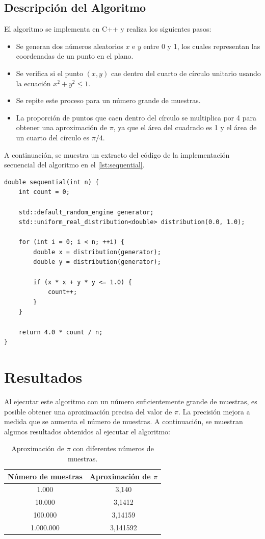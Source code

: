 \documentclass[a4paper, 10pt, onecolumn]{IEEEtran}
\begin{document}
\subsection{Descripción del Algoritmo}
El algoritmo se implementa en C++ y realiza los siguientes pasos:

\begin{itemize}
    \item Se generan dos números aleatorios $x$ e $y$ entre 0 y 1, los cuales representan las coordenadas de un punto en el plano.
    \item Se verifica si el punto $(x, y)$ cae dentro del cuarto de círculo unitario usando la ecuación $x^2 + y^2 \leq 1$.
    \item Se repite este proceso para un número grande de muestras.
    \item La proporción de puntos que caen dentro del círculo se multiplica por 4 para obtener una aproximación de $\pi$, ya que el área del cuadrado es 1 y el área de un cuarto del círculo es $\pi/4$.
\end{itemize}

A continuación, se muestra un extracto del código de la implementación secuencial del algoritmo en el \cref{lst:sequential}.

\begin{lstlisting}[caption={Implementación Secuencial de Monte Carlo en C++}, label={lst:sequential}]
double sequential(int n) {
	int count = 0;
	
	std::default_random_engine generator;
	std::uniform_real_distribution<double> distribution(0.0, 1.0);
	
	for (int i = 0; i < n; ++i) {
		double x = distribution(generator);
		double y = distribution(generator);
		
		if (x * x + y * y <= 1.0) {
			count++;
		}
	}
	
	return 4.0 * count / n;
}
\end{lstlisting}

\section{Resultados}
Al ejecutar este algoritmo con un número suficientemente grande de muestras, es posible obtener una aproximación precisa del valor de $\pi$. La precisión mejora a medida que se aumenta el número de muestras. A continuación, se muestran algunos resultados obtenidos al ejecutar el algoritmo:

\begin{table}[H]
    \centering
    \begin{tabular}{|c|c|}
    \hline
    \textbf{Número de muestras} & \textbf{Aproximación de $\pi$} \\
    \hline
    1.000 & 3,140 \\
    10.000 & 3,1412 \\
    100.000 & 3,14159 \\
    1.000.000 & 3,141592 \\
    \hline
    \end{tabular}
    \caption{Aproximación de $\pi$ con diferentes números de muestras.}
    \label{tab:results}
\end{table}
\end{document}
